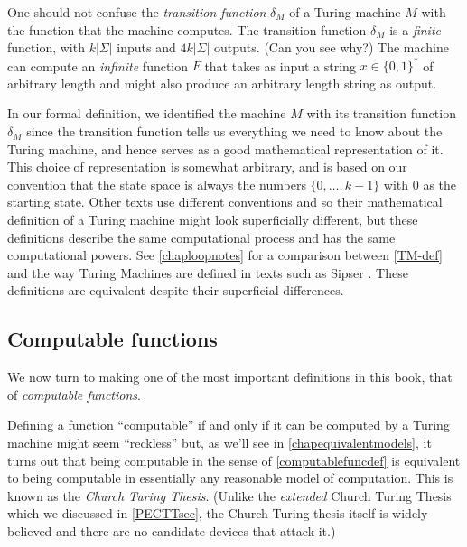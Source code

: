 One should not confuse the \emph{transition function} \(\delta_M\) of a
Turing machine \(M\) with the function that the machine computes. The
transition function \(\delta_M\) is a \emph{finite} function, with
\(k|\Sigma|\) inputs and \(4k|\Sigma|\) outputs. (Can you see why?) The
machine can compute an \emph{infinite} function \(F\) that takes as
input a string \(x\in \{0,1\}^*\) of arbitrary length and might also
produce an arbitrary length string as output.

In our formal definition, we identified the machine \(M\) with its
transition function \(\delta_M\) since the transition function tells us
everything we need to know about the Turing machine, and hence serves as
a good mathematical representation of it. This choice of representation
is somewhat arbitrary, and is based on our convention that the state
space is always the numbers \(\{0,\ldots,k-1\}\) with \(0\) as the
starting state. Other texts use different conventions and so their
mathematical definition of a Turing machine might look superficially
different, but these definitions describe the same computational process
and has the same computational powers. See \cref{chaploopnotes} for a
comparison between \cref{TM-def} and the way Turing Machines are defined
in texts such as Sipser \cite{SipserBook}. These definitions are
equivalent despite their superficial differences.

\subsection{Computable functions}\label{Computable-functions}

We now turn to making one of the most important definitions in this
book, that of \emph{computable functions}.

\hypertarget{computablefuncdef}{}

Defining a function ``computable'' if and only if it can be computed by
a Turing machine might seem ``reckless'' but, as we'll see in
\cref{chapequivalentmodels}, it turns out that being computable in the
sense of \cref{computablefuncdef} is equivalent to being computable in
essentially any reasonable model of computation. This is known as the
\emph{Church Turing Thesis}. (Unlike the \emph{extended} Church Turing
Thesis which we discussed in \cref{PECTTsec}, the Church-Turing thesis
itself is widely believed and there are no candidate devices that attack
it.)

